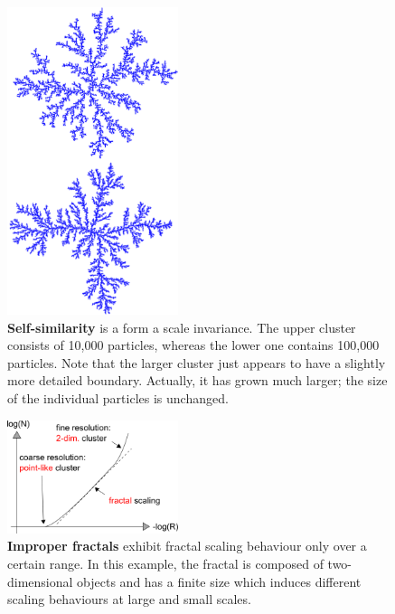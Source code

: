 \documentclass[twocolumn, 10pt]{scrartcl}
\begin{document}
        \begin{figure}
            \center
            \includegraphics[width=5cm]{img/selfsim.png}
            \caption[Self-similarity]
                {\small\textbf{Self-similarity} is a form a scale invariance. The upper cluster consists of 10,000
                particles, whereas the lower one contains 100,000 particles. Note that the larger cluster just appears
                to have a slightly more detailed boundary. Actually, it has grown much larger; the size of the
                individual particles is unchanged.}
            \label{fig-selfsim}
        \end{figure}

        \begin{figure}
            \center
            \includegraphics[width=5cm]{img/scale.png}
            \caption[Improper Fractals]
                {\small\textbf{Improper fractals} exhibit fractal scaling behaviour only over a certain range.
                In this example, the fractal is composed of two-dimensional objects and has a finite size
                which induces different scaling behaviours at large and small scales.}
            \label{fig-scale}
        \end{figure}
\end{document}
